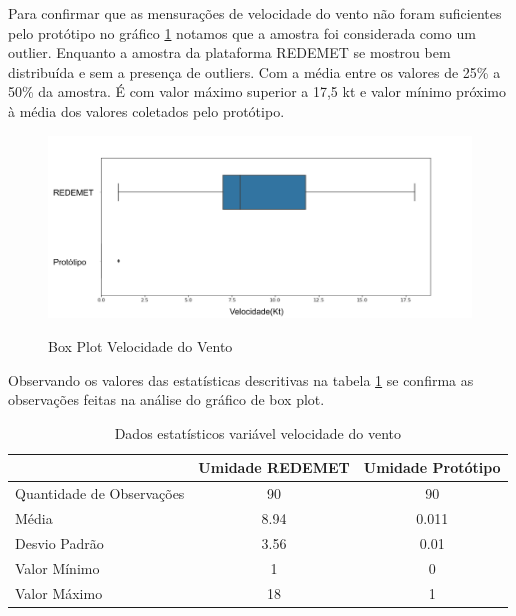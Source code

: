 Para confirmar que as mensurações de velocidade do vento não foram suficientes pelo protótipo no gráfico \ref{fig:box_plot_velvento} notamos que a amostra foi considerada como um outlier. Enquanto a amostra da plataforma REDEMET se mostrou bem distribuída e sem a presença de outliers. Com a média entre os valores de 25\% a 50\% da amostra. É com valor máximo superior a 17,5 kt e valor mínimo próximo à média dos valores coletados pelo protótipo.

\begin{figure} [!h]
    \centering
    \caption{Box Plot Velocidade do Vento}
    \includegraphics [scale = 0.5] {Figuras/box_plot_vento.png}
    \label{fig:box_plot_velvento}
\end{figure}

Observando os valores das estatísticas descritivas na tabela \ref{tab:est_desc_velvento_prot} se confirma as observações feitas na análise do gráfico de box plot.

\begin{table}[]
\centering
\begin{tabular}{l|c|c|}
\cline{2-3}
                                                & \multicolumn{1}{l|}{\textbf{Umidade REDEMET}} & \textbf{Umidade Protótipo} \\ \hline
\multicolumn{1}{|l|}{Quantidade de Observações} & 90                                            & 90                         \\ \hline
\multicolumn{1}{|l|}{Média}                     & 8.94                                          & 0.011                      \\ \hline
\multicolumn{1}{|l|}{Desvio Padrão}             & 3.56                                          & 0.01                       \\ \hline
\multicolumn{1}{|l|}{Valor Mínimo}              & 1                                             & 0                          \\ \hline
\multicolumn{1}{|l|}{Valor Máximo}              & 18                                            & 1                          \\ \hline
\end{tabular}
\caption{Dados estatísticos variável velocidade do vento}
\label{tab:est_desc_velvento_prot}
\end{table}

